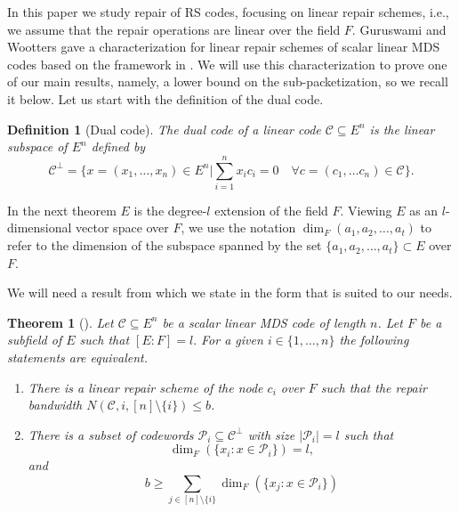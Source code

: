 \documentclass[11pt,onecolumn]{IEEEtran}
\newtheorem{theorem}{Theorem}
\newtheorem{definition}{Definition}
\newcommand{\cC}{\mathcal{C}}
\newcommand{\cP}{\mathcal{P}}
\begin{document}
In this paper we study repair of RS codes, focusing on linear repair schemes, i.e., we assume that the repair operations
are linear over the field  $F.$
Guruswami and Wootters \cite{Guruswami16} gave a characterization for
linear repair schemes of scalar linear MDS codes based on the framework in \cite{Shanmugam14}.
We will use this characterization to prove one of our main results, namely, a lower bound on the sub-packetization, so we recall it below.  Let us start with the definition of the dual code.
\begin{definition}[Dual code]
The dual code of a linear code $\cC \subseteq E^n$ is the linear subspace of $E^n$ defined by
$$
\cC^{\perp}=\big\{x=(x_1,\dots,x_n) \in E^n \big|\sum_{i=1}^n x_i c_i = 0 \quad \forall c=(c_1,\dots c_n)\in\cC \big\}.
$$
\end{definition}
In the next theorem $E$ is the degree-$l$ extension of the field $F$. Viewing $E$ as an $l$-dimensional vector space over $F$, we use the notation
$\dim_F(a_1,a_2,\dots,a_t)$ to refer to the dimension of the subspace spanned by the set $\{a_1,a_2,\dots,a_t\}\subset E$ over $F$.

We will need a result from \cite{Guruswami16} which we state in the form that is suited to our needs.
\begin{theorem}[\cite{Guruswami16}]\label{Thm:Guru}
Let $\cC\subseteq E^n$ be a scalar linear MDS code of length $n$. Let $F$ be a subfield of $E$ such that $[E:F]=l.$ For a given $i\in \{1,\dots,n\}$  the following statements are equivalent.

\begin{enumerate}[(1)]
\item There is a linear repair scheme of the node $c_i$ over $F$ 
such that the repair bandwidth $N(\cC,i,[n]\setminus\{i\}) \le b$.

\item There is a subset of codewords $\cP_i \subseteq \cC^{\perp}$
with size $|\cP_i|=l$ such that
$$
\dim_F ( \{x_i: x\in \cP_i\}) = l,
$$
and 
$$
b \ge \sum_{j\in[n]\setminus\{i\}} \dim_F ( \{x_j: x\in \cP_i\})
$$
\end{enumerate}
\end{theorem}
\end{document}
